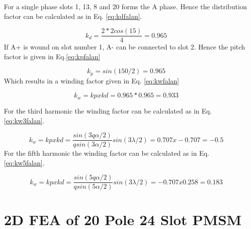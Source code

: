 \documentclass{article}
\begin{document}
For a single phase slots 1, 13, 8 and 20 forms the A phase. Hence the distribution factor can be calculated as in Eq. \ref{eq:kdfalan}.

\begin{equation}
	k_d=\frac{2*2cos(15)}{4}=0.965
	\label{eq:kdfalan}
\end{equation}
 If A+ is wound on slot number 1, A- can be connected to slot 2. Hence the pitch factor is given in Eq.\ref{eq:kpfalan}
 
 \begin{equation}
 k_p=sin(150/2)=0.965
 \label{eq:kpfalan}
 \end{equation}
  Which results in a winding factor given in Eq. \ref{eq:kwfalan}
  
   \begin{equation}
  k_w=kpxkd=0.965*0.965=0.933
  \label{eq:kwfalan}
  \end{equation}
  
 For the third harmonic the winding factor can be calculated as in Eq.\ref{eq:kw3falan}. 
 
    \begin{equation}
  k_w=kpxkd=\frac{sin(3q\alpha/2)}{qsin(3\alpha/2)}sin(3\lambda/2)=0.707x -0.707=-0.5
  \label{eq:kw3falan}
  \end{equation}
  For the fifth harmonic the winding factor can be calculated as in Eq. \ref{eq:kw5falan}.
  
  \begin{equation}
  k_w=kpxkd=\frac{sin(5q\alpha/2)}{qsin(5\alpha/2)}sin(3\lambda/2)=-0.707x 0.258=0.183 
  \label{eq:kw5falan}
  \end{equation}
  
 \section{2D FEA of 20 Pole 24 Slot PMSM}
 
 
 
\end{document}
